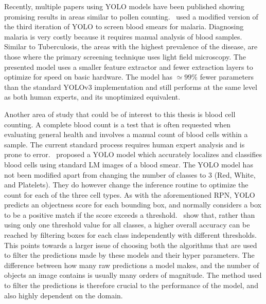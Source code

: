 Recently, multiple papers using YOLO models have been published showing promising results in areas similar to pollen counting.\ \textcite{chibuta_real_time_2020} used a modified version of the third iteration of YOLO to screen blood smears for malaria.
Diagnosing malaria is very costly because it requires manual analysis of blood samples.
Similar to Tuberculosis, the areas with the highest prevalence of the disease, are those where the primary screening technique uses light field microscopy.
The presented model uses a smaller feature extractor and fewer extraction layers to optimize for speed on basic hardware.
The model has \( \simeq 99\% \) fewer parameters than the standard YOLOv3 implementation and still performs at the same level as both human experts, and its unoptimized equivalent.

Another area of study that could be of interest to this thesis is blood cell counting.
A complete blood count is a test that is often requested when evaluating general health and involves a manual count of blood cells within a sample.
The current standard process requires human expert analysis and is prone to error.\ \textcite{islam_machine_2019} proposed a YOLO model which accurately localizes and classifies blood cells using standard LM images of a blood smear.
The YOLO model has not been modified apart from changing the number of classes to 3 (Red, White, and Platelets).
They do however change the inference routine to optimize the count for each of the three cell types.
As with the aforementioned RPN, YOLO predicts an objectness score for each bounding box, and normally considers a box to be a positive match if the score exceeds a threshold.\ \citeauthor{islam_machine_2019} show that, rather than using only one threshold value for all classes, a higher overall accuracy can be reached by filtering boxes for each class independently with different thresholds.
This points towards a larger issue of choosing both the algorithms that are used to filter the predictions made by these models and their hyper parameters.
The difference between how many raw predictions a model makes, and the number of objects an image contains is usually many orders of magnitude.
The method used to filter the predictions is therefore crucial to the performance of the model, and also highly dependent on the domain.

